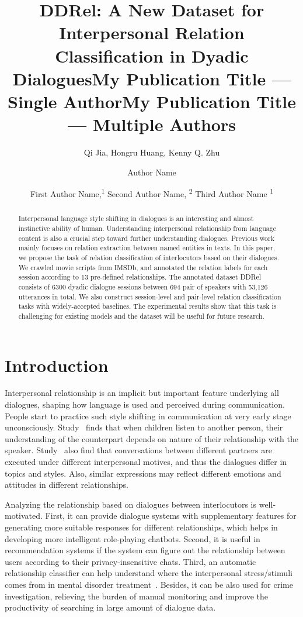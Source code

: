 \documentclass[letterpaper]{article} \usepackage{aaai21}  \usepackage{times}  \usepackage{helvet} \usepackage{courier}  \usepackage[hyphens]{url}  \usepackage{graphicx} \usepackage{xcolor}
\title{DDRel: A New Dataset for Interpersonal Relation Classification in Dyadic Dialogues}
\author{
Qi Jia,
    Hongru Huang,
    Kenny Q. Zhu
}
\title{My Publication Title --- Single Author}
\author {
Author Name \\
}
\title{My Publication Title --- Multiple Authors}
\author {


        First Author Name,\textsuperscript{\rm 1}
        Second Author Name, \textsuperscript{\rm 2}
        Third Author Name \textsuperscript{\rm 1} \\
}
\begin{document}
\maketitle 

\begin{abstract}
Interpersonal language style shifting in dialogues is an interesting and almost instinctive ability of human. Understanding interpersonal relationship from language content is also a crucial step toward further understanding dialogues. 
Previous work mainly focuses on relation extraction between 
named entities in texts.  In this paper, we propose the task of 
relation classification of interlocutors based on their dialogues.  
We crawled movie scripts from IMSDb, and annotated the relation labels for each session according to 13 pre-defined relationships. 
The annotated dataset DDRel consists of 6300 dyadic dialogue sessions 
between 694 pair of speakers with 53,126 utterances in total. 
We also construct session-level and pair-level relation classification tasks with widely-accepted baselines. The experimental results show that 
this task is challenging for existing models and the dataset will be useful 
for future research.
\end{abstract}


\section{Introduction}

Interpersonal relationship is an implicit but important feature 
underlying all dialogues, shaping how language is used and perceived 
during communication. People start to practice such style shifting in 
communication at very early stage unconsciously. Study~\cite{mind-reading} 
finds that when children listen to another person, their understanding 
of the counterpart depends on nature of their relationship with the speaker. 
Study~\cite{conversational-motive} also find that conversations between 
different partners are executed under different interpersonal motives, 
and thus the dialogues differ in topics and styles. 
Also, similar expressions may reflect different emotions and attitudes in 
different relationships. 

Analyzing the relationship based on dialogues between interlocutors 
is well-motivated. First, it can provide dialogue systems with 
supplementary features for generating more suitable responses for different 
relationships, which helps in developing more intelligent role-playing chatbots.
Second, it is useful in recommendation systems if the system can figure 
out the relationship between users according to their privacy-insensitive chats.
Third, an automatic relationship classifier can help 
understand where the interpersonal stress/stimuli comes from in 
mental disorder treatment~\cite{tension-monitor,bopolar-monitor,cog-load}.
Besides, it can be also used for crime investigation, relieving
the burden of manual monitoring and improve the productivity of searching
in large amount of dialogue data. 
\end{document}
